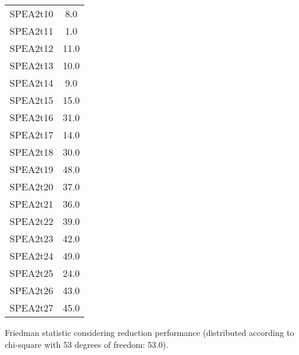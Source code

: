 \documentclass{article}
\begin{document}
\begin{table}[!htp]
\begin{tabular}{c|c}
SPEA2t10&8.0\\
SPEA2t11&1.0\\
SPEA2t12&11.0\\
SPEA2t13&10.0\\
SPEA2t14&9.0\\
SPEA2t15&15.0\\
SPEA2t16&31.0\\
SPEA2t17&14.0\\
SPEA2t18&30.0\\
SPEA2t19&48.0\\
SPEA2t20&37.0\\
SPEA2t21&36.0\\
SPEA2t22&39.0\\
SPEA2t23&42.0\\
SPEA2t24&49.0\\
SPEA2t25&24.0\\
SPEA2t26&43.0\\
SPEA2t27&45.0\\
\end{tabular}
\end{table}


Friedman statistic considering reduction performance (distributed according to chi-square with 53 degrees of freedom: 53.0).
\end{document}
